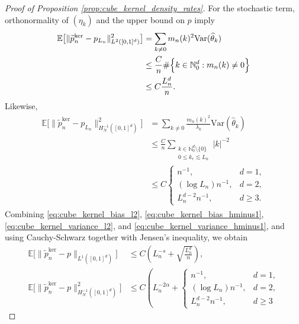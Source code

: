 \documentclass[11pt,reqno]{amsart}
\theoremstyle{definition}
\renewcommand{\hat}{\widehat}
\renewcommand{\tilde}{\widetilde}
\newcommand{\Ep}{\mathbb{E}}
\begin{document}
\begin{proof}[Proof of Proposition \ref{prop:cube_kernel_density_rates}]
For the stochastic term, orthonormality of $(\eta_k)$ and the upper bound on $p$ imply
\begin{align}
\label{eq:cube_kernel_variance_l2}
\begin{aligned}
    \Ep\bigl[\|\tilde p_n^{\mathrm{ker}}-p_{L_n}\|_{L^2([0,1]^d)}^2\bigr]
    &=
    \sum_{k\neq 0}
    m_n(k)^2
    \mathrm{Var}(\hat\theta_k)
    \\
    &\le
    \frac{C}{n}
    \#\Bigl\{k\in\mathbb N_0^d:m_n(k)\neq 0\Bigr\}
    \\
    &\le
    C\frac{L_n^d}{n}.
\end{aligned}
\end{align}
Likewise,
\begin{align}
\label{eq:cube_kernel_variance_hminus1}
\begin{aligned}
    \Ep\bigl[\|\tilde p_n^{\mathrm{ker}}-p_{L_n}\|_{H^{-1}_N([0,1]^d)}^2\bigr]
    &=
    \sum_{k\neq 0}
    \frac{m_n(k)^2}{\lambda_k}
    \mathrm{Var}(\hat\theta_k)
    \\
    &\le
    \frac{C}{n}
    \sum_{\substack{k\in\mathbb N_0^d\setminus\{0\}\\0\le k_r\lesssim L_n}}
    |k|^{-2}
    \\
    &\le
    C
    \begin{cases}
        n^{-1}, & d=1,
        \\
        (\log L_n)n^{-1}, & d=2,
        \\
        L_n^{d-2}n^{-1}, & d\ge 3.
    \end{cases}
\end{aligned}
\end{align}
Combining \eqref{eq:cube_kernel_bias_l2}, \eqref{eq:cube_kernel_bias_hminus1}, \eqref{eq:cube_kernel_variance_l2}, and \eqref{eq:cube_kernel_variance_hminus1}, and using Cauchy-Schwarz together with Jensen's inequality, we obtain
\begin{align}
    \Ep\bigl[\|\tilde p_n^{\mathrm{ker}}-p\|_{L^1([0,1]^d)}\bigr]
    &\le
    C\left(
        L_n^{-s}
        +
        \sqrt{\frac{L_n^d}{n}}
    \right),
    \\
\label{eq:cube_kernel_preliminary_hminus1}
    \Ep\bigl[\|\tilde p_n^{\mathrm{ker}}-p\|_{H^{-1}_N([0,1]^d)}^2\bigr]
    &\le
    C\left(
        L_n^{-2\alpha}
        +
        \begin{cases}
            n^{-1}, & d=1,
            \\
            (\log L_n)n^{-1}, & d=2,
            \\
            L_n^{d-2}n^{-1}, & d\ge 3

\end{cases}
\end{align}
\end{proof}
\end{document}
